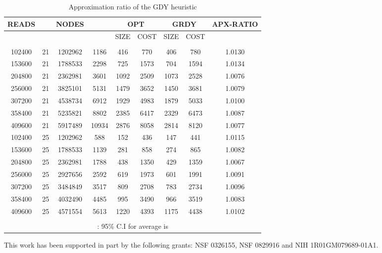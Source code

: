 \documentclass[runningheads]{llncs}
\begin{document}
\begin{table}
\begin{center}
\begin{tabular}{|c|c|c|c|c|c|c|c|c|}
\hline
READS &   & NODES &  &\multicolumn{2}{|c|}{OPT} & \multicolumn{2}{|c|}{GRDY} & APX-RATIO\\ 
\hline
 & & & &SIZE&COST&SIZE&COST \\
\hline
 &&&& &  &  &  &  \\
\hline
102400 & 21 & 1202962 & 1186 & 416 & 770 & 406 & 780 & 1.0130 \\ 
\hline
153600 & 21 & 1788533 & 2298 & 725 & 1573 & 704 & 1594 & 1.0134 \\ 
\hline
204800 & 21 & 2362981 & 3601 & 1092 & 2509 & 1073 & 2528 & 1.0076 \\ 
\hline
256000 & 21 & 3825101 & 5131 & 1479 & 3652 & 1450 & 3681 & 1.0079 \\ 
\hline
307200 & 21 & 4538734 & 6912 & 1929 & 4983 & 1879 & 5033 & 1.0100 \\ 
\hline
358400 & 21 & 5235821 & 8802 & 2385 & 6417 & 2329 & 6473 & 1.0087 \\ 
\hline
409600 & 21 & 5917489 & 10934 & 2876 & 8058 & 2814 & 8120 & 1.0077 \\ 
\hline
102400 & 25 & 1202962 & 588 & 152 & 436 & 147 & 441 & 1.0115 \\ 
\hline
153600 & 25 & 1788533 & 1139 & 281 & 858 & 274 & 865 & 1.0082 \\ 
\hline
204800 & 25 & 2362981 & 1788 & 438 & 1350 & 429 & 1359 & 1.0067 \\ 
\hline
256000 & 25 & 2927656 & 2592 & 619 & 1973 & 601 & 1991 & 1.0091 \\ 
\hline
307200 & 25 & 3484849 & 3517 & 809 & 2708 & 783 & 2734 & 1.0096 \\ 
\hline
358400 & 25 & 4032490 & 4485 & 995 & 3490 & 966 & 3519 & 1.0083 \\ 
\hline
409600 & 25 & 4571554 & 5613 & 1220 & 4393 & 1175 & 4438 & 1.0102 \\ 
\hline
\multicolumn{9}{|c|}{}\\ 
 \multicolumn{9}{|c|}{ :  95\% C.I for average  is } \\ 
\hline
\end{tabular}
 \end{center}
\caption{Approximation ratio of the {\sf GDY} heuristic}
\label{tab:appx}
\end{table}


 This work has been supported in
part by the following grants: NSF 0326155, NSF 0829916 and NIH
1R01GM079689-01A1.
\end{document}
